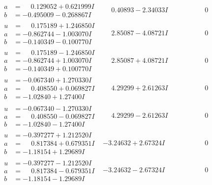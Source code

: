 \documentclass[1p]{elsarticle_modified}
\theoremstyle{definition}
\begin{document}
$$\begin{array}{c|c|c}
\begin{aligned}
a &= \phantom{-}0.129052 + 0.621999 I \\
b &= -0.495009 - 0.268867 I\end{aligned}
 & \phantom{-}0.40893 - 2.34033 I & \phantom{-0.000000 } 0 \\ \hline\begin{aligned}
u &= \phantom{-}0.175189 + 1.246850 I \\
a &= -0.862744 - 1.003070 I \\
b &= -0.140349 - 0.100770 I\end{aligned}
 & \phantom{-}2.85087 - 4.08721 I & \phantom{-0.000000 } 0 \\ \hline\begin{aligned}
u &= \phantom{-}0.175189 - 1.246850 I \\
a &= -0.862744 + 1.003070 I \\
b &= -0.140349 + 0.100770 I\end{aligned}
 & \phantom{-}2.85087 + 4.08721 I & \phantom{-0.000000 } 0 \\ \hline\begin{aligned}
u &= -0.067340 + 1.270330 I \\
a &= \phantom{-}0.408550 + 0.069827 I \\
b &= -1.02840 + 1.27400 I\end{aligned}
 & \phantom{-}4.29299 + 2.61263 I & \phantom{-0.000000 } 0 \\ \hline\begin{aligned}
u &= -0.067340 - 1.270330 I \\
a &= \phantom{-}0.408550 - 0.069827 I \\
b &= -1.02840 - 1.27400 I\end{aligned}
 & \phantom{-}4.29299 - 2.61263 I & \phantom{-0.000000 } 0 \\ \hline\begin{aligned}
u &= -0.397277 + 1.212520 I \\
a &= \phantom{-}0.817384 + 0.679351 I \\
b &= -1.18154 + 1.29689 I\end{aligned}
 & -3.24632 + 2.67324 I & \phantom{-0.000000 } 0 \\ \hline\begin{aligned}
u &= -0.397277 - 1.212520 I \\
a &= \phantom{-}0.817384 - 0.679351 I \\
b &= -1.18154 - 1.29689 I\end{aligned}
 & -3.24632 - 2.67324 I & \phantom{-0.000000 } 0 \\ \hline\begin{aligned}

\end{aligned}
\end{array}$$
\end{document}
